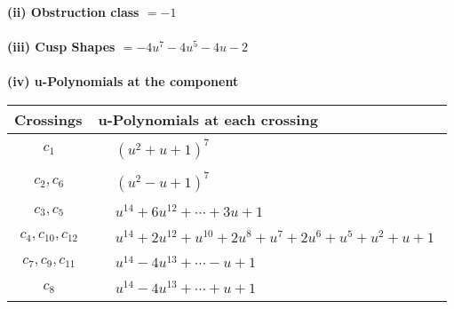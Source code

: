 \documentclass[1p]{elsarticle_modified}
\theoremstyle{definition}
\begin{document}
\flushleft \textbf{(ii) Obstruction class $= -1$}\\~\\
\flushleft \textbf{(iii) Cusp Shapes $= -4 u^7-4 u^5-4 u-2$}\\~\\
\newpage\renewcommand{\arraystretch}{1}
\flushleft \textbf{(iv) u-Polynomials at the component}\newline \\
\begin{tabular}{m{50pt}|m{274pt}}
Crossings & \hspace{64pt}u-Polynomials at each crossing \\
\hline $$\begin{aligned}c_{1}\end{aligned}$$&$\begin{aligned}
&(u^2+u+1)^7
\end{aligned}$\\
\hline $$\begin{aligned}c_{2},c_{6}\end{aligned}$$&$\begin{aligned}
&(u^2- u+1)^7
\end{aligned}$\\
\hline $$\begin{aligned}c_{3},c_{5}\end{aligned}$$&$\begin{aligned}
&u^{14}+6 u^{12}+\cdots+3 u+1
\end{aligned}$\\
\hline $$\begin{aligned}c_{4},c_{10},c_{12}\end{aligned}$$&$\begin{aligned}
&u^{14}+2 u^{12}+u^{10}+2 u^8+u^7+2 u^6+u^5+u^2+u+1
\end{aligned}$\\
\hline $$\begin{aligned}c_{7},c_{9},c_{11}\end{aligned}$$&$\begin{aligned}
&u^{14}-4 u^{13}+\cdots- u+1
\end{aligned}$\\
\hline $$\begin{aligned}c_{8}\end{aligned}$$&$\begin{aligned}
&u^{14}-4 u^{13}+\cdots+u+1
\end{aligned}$\\
\hline
\end{tabular}\\~\\
\end{document}
